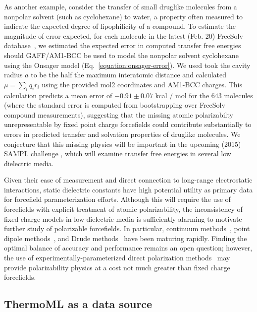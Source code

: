 \documentclass[aps,pre,twocolumn,nofootinbib,superscriptaddress,linenumbers]{revtex4-1}
\begin{document}
As another example, consider the transfer of small druglike molecules from a nonpolar solvent (such as cyclohexane) to water, a property often measured to indicate the expected degree of lipophilicity of a compound.
To estimate the magnitude of error expected, for each molecule in the latest (Feb. 20) FreeSolv database~\cite{freesolv, freesolv_github}, we estimated the expected error in computed transfer free energies should GAFF/AM1-BCC be used to model the nonpolar solvent cyclohexane using the Onsager model (Eq.~\ref{equation:onsager-error}).
We used took the cavity radius $a$ to be the half the maximum interatomic distance and calculated $\mu = \sum_i q_i r_i$ using the provided mol2 coordinates and AM1-BCC charges.  
This calculation predicts a mean error of $-0.91 \pm0.07$ kcal / mol for the 643 molecules (where the standard error is computed from bootstrapping over FreeSolv compound measurements), 
suggesting that the missing atomic polarizabilty unrepresentable by fixed point charge forcefields could contribute substantially to errors in predicted transfer and solvation properties of druglike molecules.  
We conjecture that this missing physics will be important in the upcoming (2015) SAMPL challenge \cite{newman2009practical}, which will examine transfer free energies in several low dielectric media. 

Given their ease of measurement and direct connection to long-range electrostatic interactions, static dielectric constants have high potential utility as primary data for forcefield parameterization efforts.  
Although this will require the use of forcefields with explicit treatment of atomic polarizability, the inconsistency of fixed-charge models in low-dielectric media is sufficiently alarming to motivate further study of polarizable forcefields.  In particular, continuum methods~\cite{truchon2010using, truchon2009integrated, truchon2008accurate}, point dipole methods~\cite{Ponder2010, ren2004temperature}, and Drude methods~\cite{lamoureux2003modeling, anisimov2005determination} have been maturing rapidly.  Finding the optimal balance of accuracy and performance remains an open question; however, the use of experimentally-parameterized direct polarization methods~\cite{wang2013systematic} may provide polarizability physics at a cost not much greater than fixed charge forcefields.


\subsection{ThermoML as a data source}
\end{document}
